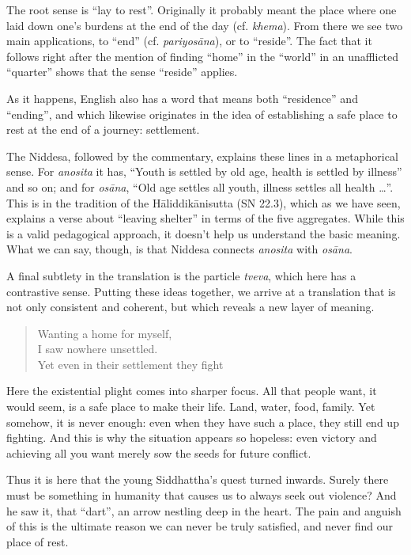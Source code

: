 \documentclass[12pt,openany]{book}%
\begin{document}
The root sense is “lay to rest”. Originally it probably meant the place where one laid down one’s burdens at the end of the day (cf. \textit{khema}). From there we see two main applications, to “end” (cf. \textit{\textsanskrit{pariyosāna}}), or to “reside”. The fact that it follows right after the mention of finding “home” in the “world” in an unafflicted “quarter” shows that the sense “reside” applies.

As it happens, English also has a word that means both “residence” and “ending”, and which likewise originates in the idea of establishing a safe place to rest at the end of a journey: settlement.

The Niddesa, followed by the commentary, explains these lines in a metaphorical sense. For \textit{anosita} it has, “Youth is settled by old age, health is settled by illness” and so on; and for \textit{\textsanskrit{osāna}}, “Old age settles all youth, illness settles all health …”. This is in the tradition of the \textsanskrit{Hāliddikānisutta} (SN 22.3), which as we have seen, explains a verse about “leaving shelter” in terms of the five aggregates. While this is a valid pedagogical approach, it doesn’t help us understand the basic meaning. What we can say, though, is that Niddesa connects \textit{anosita} with \textit{\textsanskrit{osāna}}.

A final subtlety in the translation is the particle \textit{tveva}, which here has a contrastive sense. Putting these ideas together, we arrive at a translation that is not only consistent and coherent, but which reveals a new layer of meaning.

\begin{verse}%
Wanting a home for myself, \\
I saw nowhere unsettled. \\
Yet even in their settlement they fight

%
\end{verse}

Here the existential plight comes into sharper focus. All that people want, it would seem, is a safe place to make their life. Land, water, food, family. Yet somehow, it is never enough: even when they have such a place, they still end up fighting. And this is why the situation appears so hopeless: even victory and achieving all you want merely sow the seeds for future conflict.

Thus it is here that the young Siddhattha’s quest turned inwards. Surely there must be something in humanity that causes us to always seek out violence? And he saw it, that “dart”, an arrow nestling deep in the heart. The pain and anguish of this is the ultimate reason we can never be truly satisfied, and never find our place of rest.
\end{document}
